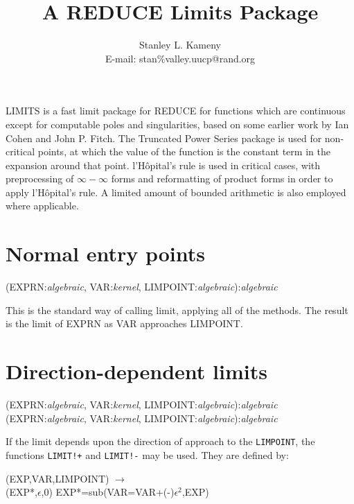 \title{A REDUCE Limits Package}
\author{Stanley L. Kameny \\ E-mail: stan\%valley.uucp@rand.org}

\date{}
\maketitle
LIMITS is a fast limit package for REDUCE for functions which are
continuous except for computable poles and singularities, based on some
earlier work by Ian Cohen and John P. Fitch.  The Truncated Power Series
package is used for non-critical points, at which the value of the
function is the constant term in the expansion around that point.
l'H\^{o}pital's rule is used in critical cases, with preprocessing of
$\infty - \infty$ forms and reformatting of product forms in order
to apply l'H\^{o}pital's rule.  A limited amount of bounded arithmetic
is also employed where applicable.

\section{Normal entry points}

\vspace{.1in}
(EXPRN:{\em algebraic}, VAR:{\em kernel}, LIMPOINT:{\em algebraic}):{\em algebraic}
\vspace{.1in}

This is the standard way of calling limit, applying all of the methods. The
result is the limit of EXPRN as VAR approaches LIMPOINT.


\section{Direction-dependent limits}

\vspace{.1in}
(EXPRN:{\em algebraic}, VAR:{\em kernel}, LIMPOINT:{\em algebraic}):{\em algebraic} \\
(EXPRN:{\em algebraic}, VAR:{\em kernel}, LIMPOINT:{\em algebraic}):{\em algebraic}
\vspace{.1in}

If the limit depends upon the direction of approach to the {\tt LIMPOINT}, the
functions {\tt LIMIT!+} and {\tt LIMIT!-} may be used.  They are defined by:

\vspace{.1in}
 (EXP,VAR,LIMPOINT) $\rightarrow$ \\
\hspace*{2em}{\tt LIMIT}(EXP*,$\epsilon$,0) EXP*=sub(VAR=VAR+(-)$\epsilon^2$,EXP)

